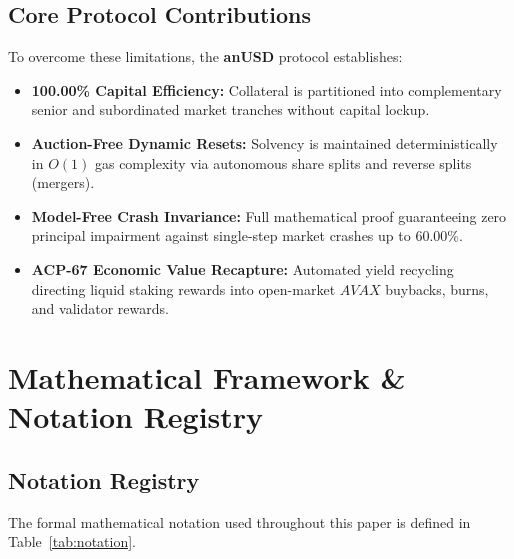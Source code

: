 \documentclass[10pt,journal,compsoc]{IEEEtran}
\begin{document}
\subsection{Core Protocol Contributions}
To overcome these limitations, the \textbf{anUSD} protocol establishes:
\begin{itemize}
    \item \textbf{100.00\% Capital Efficiency:} Collateral is partitioned into complementary senior and subordinated market tranches without capital lockup.
    \item \textbf{Auction-Free Dynamic Resets:} Solvency is maintained deterministically in $O(1)$ gas complexity via autonomous share splits and reverse splits (mergers).
    \item \textbf{Model-Free Crash Invariance:} Full mathematical proof guaranteeing zero principal impairment against single-step market crashes up to 60.00\%.
    \item \textbf{ACP-67 Economic Value Recapture:} Automated yield recycling directing liquid staking rewards into open-market $AVAX$ buybacks, burns, and validator rewards.
\end{itemize}

\section{Mathematical Framework \& Notation Registry}

\subsection{Notation Registry}
The formal mathematical notation used throughout this paper is defined in Table~\ref{tab:notation}.
\end{document}
